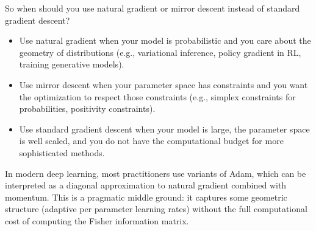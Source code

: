 So when should you use natural gradient or mirror descent instead of standard gradient descent?

\begin{itemize}
\item Use natural gradient when your model is probabilistic and you care about the geometry of distributions (e.g., variational inference, policy gradient in RL, training generative models).

\item Use mirror descent when your parameter space has constraints and you want the optimization to respect those constraints (e.g., simplex constraints for probabilities, positivity constraints).

\item Use standard gradient descent when your model is large, the parameter space is well scaled, and you do not have the computational budget for more sophisticated methods.
\end{itemize}

\vspace{1em}

In modern deep learning, most practitioners use variants of Adam, which can be interpreted as a diagonal approximation to natural gradient combined with momentum. This is a pragmatic middle ground: it captures some geometric structure (adaptive per parameter learning rates) without the full computational cost of computing the Fisher information matrix.

\vspace{2em}


